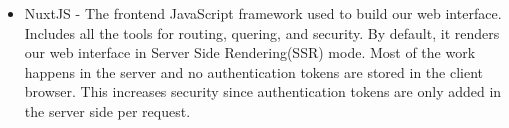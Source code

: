 \begin{itemize}
	\item	NuxtJS - The frontend JavaScript framework used to build our web interface. Includes all the tools for routing, quering, and security. By default, it renders our web interface in Server Side Rendering(SSR) mode. Most of the work happens in the server and no authentication tokens are stored in the client browser. This increases security since authentication tokens are only added in the server side per request.
\end{itemize}

